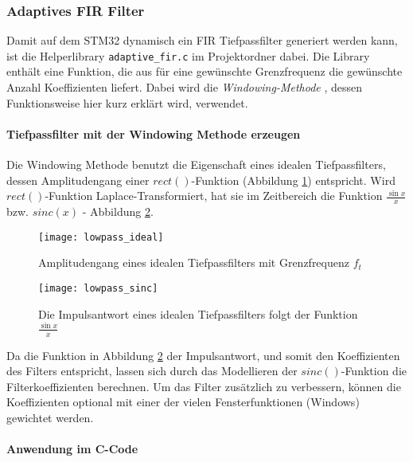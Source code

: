 \subsubsection{Adaptives FIR Filter}
\label{sec:LibFIRAdaptive}

Damit auf dem STM32 dynamisch ein FIR Tiefpassfilter generiert werden kann, ist die Helperlibrary \texttt{adaptive\_fir.c} im Projektordner dabei.
Die Library enthält eine Funktion, die aus für eine gewünschte Grenzfrequenz die gewünschte Anzahl Koeffizienten liefert.
Dabei wird die \textit{Windowing-Methode} \cite{FIR-Windowing}, dessen Funktionsweise hier kurz erklärt wird, verwendet.

\paragraph{Tiefpassfilter mit der Windowing Methode erzeugen}

Die Windowing Methode benutzt die Eigenschaft eines idealen Tiefpassfilters, dessen Amplitudengang einer $rect()$-Funktion (Abbildung \ref{pic:lowpass_ideal}) entspricht.
Wird $rect()$-Funktion Laplace-Transformiert, hat sie im Zeitbereich die Funktion $\frac{\sin{x}}{x}$ bzw. $sinc(x)$ - Abbildung \ref{pic:lowpass_sinc}.

\begin{figure}[H]
	\centering
	\texttt{[image: lowpass\_ideal]}
	\caption{Amplitudengang eines idealen Tiefpassfilters mit Grenzfrequenz $f_t$ \cite{FIR-Windowing}}
	\label{pic:lowpass_ideal}
\end{figure}

\begin{figure}[H]
	\centering
	\texttt{[image: lowpass\_sinc]}
	\caption{Die Impulsantwort eines idealen Tiefpassfilters folgt der Funktion $\frac{\sin{x}}{x}$ \cite{FIR-Windowing}}
	\label{pic:lowpass_sinc}
\end{figure}

Da die Funktion in Abbildung \ref{pic:lowpass_sinc} der Impulsantwort, und somit den Koeffizienten des Filters entspricht, lassen sich durch das Modellieren der $sinc()$-Funktion die Filterkoeffizienten berechnen.
Um das Filter zusätzlich zu verbessern, können die Koeffizienten optional mit einer der vielen Fensterfunktionen (Windows) gewichtet werden.

\paragraph{Anwendung im C-Code}

